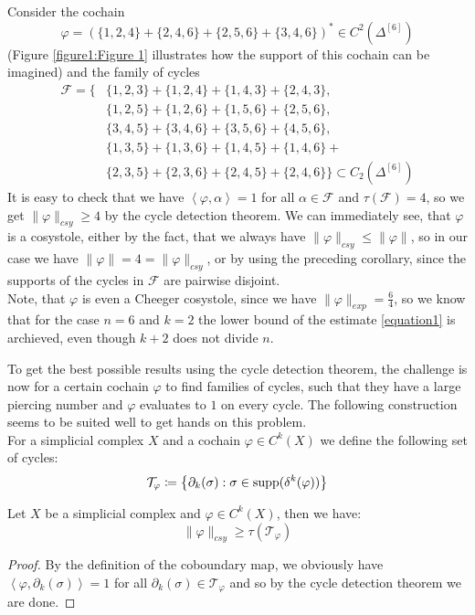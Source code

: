 \begin{expl}\label{example1a}
Consider the cochain
\[
\varphi=\left(\{1,2,4\}+\{2,4,6\}+\{2,5,6\}+\{3,4,6\}\right)^*\in C^2(\Delta^{[6]})
\]
(Figure \ref{figure1:Figure 1} illustrates how the support of this cochain can be imagined) and the family of cycles
\begin{align*}
\mathcal{F}=\{&\{1,2,3\}+\{1,2,4\}+\{1,4,3\}+\{2,4,3\},\\
&\{1,2,5\}+\{1,2,6\}+\{1,5,6\}+\{2,5,6\},\\
&\{3,4,5\}+\{3,4,6\}+\{3,5,6\}+\{4,5,6\},\\
&\{1,3,5\}+\{1,3,6\}+\{1,4,5\}+\{1,4,6\}+\\
&\{2,3,5\}+\{2,3,6\}+\{2,4,5\}+\{2,4,6\}\}\subset C_2(\Delta^{[6]})
\end{align*}
It is easy to check that we have \(\left\langle\varphi,\alpha\right\rangle=1\) for all \(\alpha\in\mathcal{F}\) and \(\tau(\mathcal{F})=4\), so we get \(\|\varphi\|_{csy}\geq 4\) by the cycle detection theorem. We can immediately see, that \(\varphi\) is a cosystole, either by the fact, that we always have \(\|\varphi\|_{csy}\leq \|\varphi\|\), so in our case we have \(\|\varphi\|=4=\|\varphi\|_{csy}\), or by using the preceding corollary, since the supports of the cycles in \(\mathcal{F}\) are pairwise disjoint.\\
Note, that \(\varphi\) is even a Cheeger cosystole, since we have \(\|\varphi\|_{exp}=\frac{6}{4}\), so we know that for the case \(n=6\) and \(k=2\) the lower bound of the estimate \ref{equation1} is archieved, even though \(k+2\) does not divide \(n\).
\end{expl}



To get the best possible results using the cycle detection theorem, the challenge is now for a certain cochain \(\varphi\) to find families of cycles, such that they have a large piercing number and \(\varphi\) evaluates to \(1\) on every cycle. The following construction seems to be suited well to get hands on this problem.\\
For a simplicial complex \(X\) and a cochain \(\varphi\in C^k(X)\) we define the following set of cycles:
\[
\mathcal{T}_{\varphi}\coloneqq \left\{\partial_k(\sigma):\sigma\in \mathrm{supp}(\delta^k(\varphi))\right\}
\]

\begin{prop}\label{proposition1a}
Let \(X\) be a simplicial complex and \(\varphi\in C^k(X)\), then we have:
\[
\|\varphi\|_{csy}\geq\tau(\mathcal{T}_{\varphi})
\]
\begin{proof}
By the definition of the coboundary map, we obviously have\\
\(\left\langle\varphi,\partial_k(\sigma)\right\rangle=1\) for all \(\partial_k(\sigma)\in\mathcal{T}_{\varphi}\) and so by the cycle detection theorem we are done.
\end{proof}
\end{prop}

